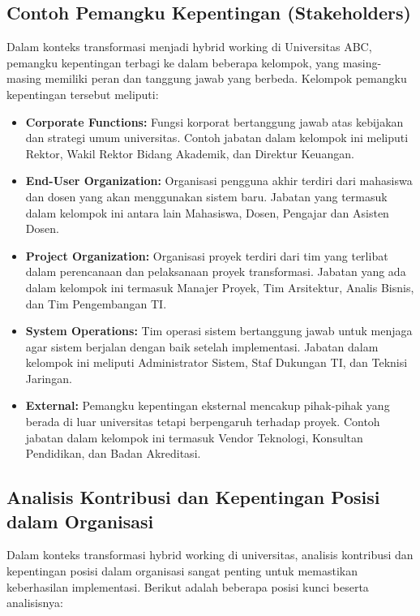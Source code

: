 \subsection{Contoh Pemangku Kepentingan (Stakeholders)}
Dalam konteks transformasi menjadi hybrid working di Universitas ABC, pemangku kepentingan terbagi ke dalam beberapa kelompok, yang masing-masing memiliki peran dan tanggung jawab yang berbeda. Kelompok pemangku kepentingan tersebut meliputi:

\begin{itemize}
	\item \textbf{Corporate Functions:} 
	Fungsi korporat bertanggung jawab atas kebijakan dan strategi umum universitas. Contoh jabatan dalam kelompok ini meliputi Rektor, Wakil Rektor Bidang Akademik, dan Direktur Keuangan.
	
	\item \textbf{End-User Organization:} 
	Organisasi pengguna akhir terdiri dari mahasiswa dan dosen yang akan menggunakan sistem baru. Jabatan yang termasuk dalam kelompok ini antara lain Mahasiswa, Dosen, Pengajar dan Asisten Dosen.
	
	\item \textbf{Project Organization:} 
	Organisasi proyek terdiri dari tim yang terlibat dalam perencanaan dan pelaksanaan proyek transformasi. Jabatan yang ada dalam kelompok ini termasuk Manajer Proyek, Tim Arsitektur, Analis Bisnis, dan Tim Pengembangan TI.
	
	\item \textbf{System Operations:} 
	Tim operasi sistem bertanggung jawab untuk menjaga agar sistem berjalan dengan baik setelah implementasi. Jabatan dalam kelompok ini meliputi Administrator Sistem, Staf Dukungan TI, dan Teknisi Jaringan.
	
	\item \textbf{External:} 
	Pemangku kepentingan eksternal mencakup pihak-pihak yang berada di luar universitas tetapi berpengaruh terhadap proyek. Contoh jabatan dalam kelompok ini termasuk Vendor Teknologi, Konsultan Pendidikan, dan Badan Akreditasi.
\end{itemize}

\subsection{Analisis Kontribusi dan Kepentingan Posisi dalam Organisasi}

Dalam konteks transformasi hybrid working di universitas, analisis kontribusi dan kepentingan posisi dalam organisasi sangat penting untuk memastikan keberhasilan implementasi. Berikut adalah beberapa posisi kunci beserta analisisnya:

